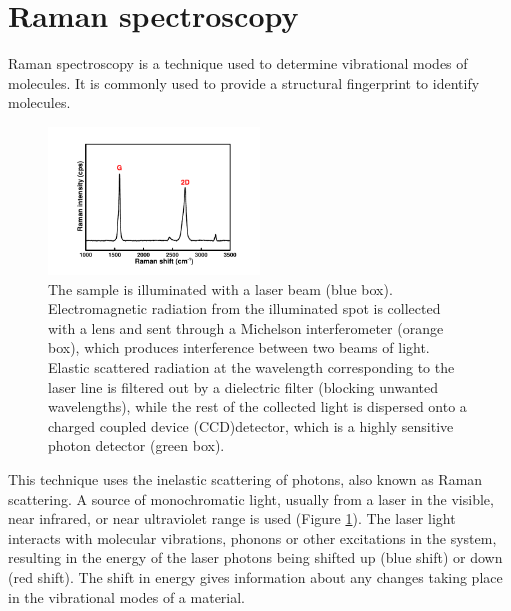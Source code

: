 \section{Raman spectroscopy}
Raman spectroscopy is a technique used to determine vibrational modes of molecules. It is commonly used to provide a structural fingerprint to identify molecules.
\begin{figure}[tbh!]
\centering
\includegraphics[width=0.5\textwidth]{Figures/chap2fig/Raman}
\caption{The sample is illuminated with a laser beam (blue box). Electromagnetic radiation from the illuminated spot is collected with a lens and sent through a Michelson interferometer (orange box), which produces interference between two beams of light. Elastic scattered radiation at the wavelength corresponding to the laser line is filtered out by a dielectric filter (blocking unwanted wavelengths), while the rest of the collected light is dispersed onto a charged coupled device (CCD)detector, which is a highly sensitive photon detector (green box).}
\label{Figures/chap2fig:Raman}
\end{figure}
This technique uses the inelastic scattering of photons, also known as Raman scattering. A source of monochromatic light, usually from a laser in the visible, near infrared, or near ultraviolet range is used (Figure \ref{Figures/chap2fig:Raman}). The laser light interacts with molecular vibrations, phonons or other excitations in the system, resulting in the energy of the laser photons being shifted up (blue shift) or down (red shift). The shift in energy gives information about any changes taking place in the vibrational modes of a material. 


